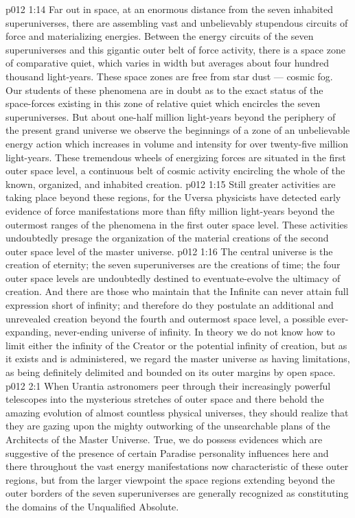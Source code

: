 \vs p012 1:14  Far out in space, at an enormous distance from the seven inhabited superuniverses, there are assembling vast and unbelievably stupendous circuits of force and materializing energies. Between the energy circuits of the seven superuniverses and this gigantic outer belt of force activity, there is a space zone of comparative quiet, which varies in width but averages about four hundred thousand light\hyp{}years. These space zones are free from star dust --- cosmic fog. Our students of these phenomena are in doubt as to the exact status of the space\hyp{}forces existing in this zone of relative quiet which encircles the seven superuniverses. But about one\hyp{}half million light\hyp{}years beyond the periphery of the present grand universe we observe the beginnings of a zone of an unbelievable energy action which increases in volume and intensity for over twenty\hyp{}five million light\hyp{}years. These tremendous wheels of energizing forces are situated in the first outer space level, a continuous belt of cosmic activity encircling the whole of the known, organized, and inhabited creation.
\vs p012 1:15 Still greater activities are taking place beyond these regions, for the Uversa physicists have detected early evidence of force manifestations more than fifty million light\hyp{}years beyond the outermost ranges of the phenomena in the first outer space level. These activities undoubtedly presage the organization of the material creations of the second outer space level of the master universe.
\vs p012 1:16 The central universe is the creation of eternity; the seven superuniverses are the creations of time; the four outer space levels are undoubtedly destined to eventuate\hyp{}evolve the ultimacy of creation. And there are those who maintain that the Infinite can never attain full expression short of infinity; and therefore do they postulate an additional and unrevealed creation beyond the fourth and outermost space level, a possible ever\hyp{}expanding, never\hyp{}ending universe of infinity. In theory we do not know how to limit either the infinity of the Creator or the potential infinity of creation, but as it exists and is administered, we regard the master universe as having limitations, as being definitely delimited and bounded on its outer margins by open space.
\vs p012 2:1 When Urantia astronomers peer through their increasingly powerful telescopes into the mysterious stretches of outer space and there behold the amazing evolution of almost countless physical universes, they should realize that they are gazing upon the mighty outworking of the unsearchable plans of the Architects of the Master Universe. True, we do possess evidences which are suggestive of the presence of certain Paradise personality influences here and there throughout the vast energy manifestations now characteristic of these outer regions, but from the larger viewpoint the space regions extending beyond the outer borders of the seven superuniverses are generally recognized as constituting the domains of the Unqualified Absolute.
